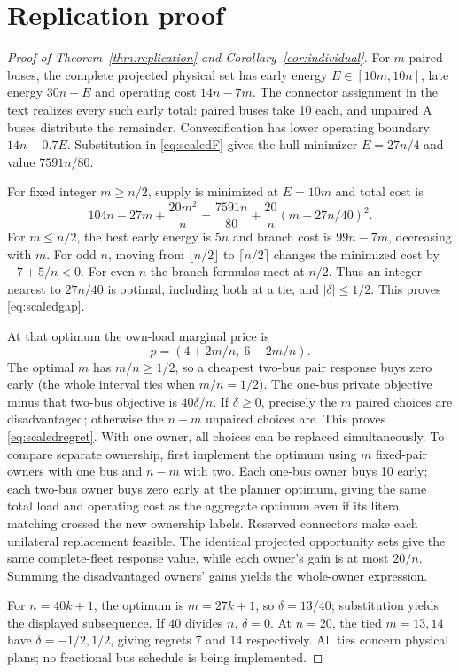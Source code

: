 \section{Replication proof}\label{app:replication}
\begin{proof}[Proof of Theorem~\ref{thm:replication} and
Corollary~\ref{cor:individual}]
For $m$ paired buses, the complete projected physical set has early energy
$E\in[10m,10n]$, late energy $30n-E$ and operating cost $14n-7m$.
The connector assignment in the text realizes every such early total:
paired buses take 10 each, and unpaired A buses distribute the remainder.
Convexification has lower operating boundary $14n-0.7E$. Substitution
in \eqref{eq:scaledF} gives the hull minimizer $E=27n/4$ and value
$7591n/80$.

For fixed integer $m\ge n/2$, supply is minimized at $E=10m$ and total
cost is
\[
 104n-27m+\frac{20m^2}{n}
 =\frac{7591n}{80}+\frac{20}{n}(m-27n/40)^2.
\]
For $m\le n/2$, the best early energy is $5n$ and branch cost is
$99n-7m$, decreasing with $m$. For odd $n$, moving from
$\lfloor n/2\rfloor$ to $\lceil n/2\rceil$ changes the minimized
cost by $-7+5/n<0$. For even $n$ the branch formulas meet at $n/2$.
Thus an integer nearest to $27n/40$ is optimal, including both at a tie,
and $|\delta|\le1/2$. This proves \eqref{eq:scaledgap}.

At that optimum the own-load marginal price is
\[
 p=(4+2m/n,\ 6-2m/n).
\]
The optimal $m$ has $m/n\ge1/2$, so a cheapest two-bus pair response
buys zero early (the whole interval ties when $m/n=1/2$).
The one-bus private objective minus that two-bus
objective is $40\delta/n$. If $\delta\ge0$, precisely the $m$
paired choices are disadvantaged; otherwise the $n-m$ unpaired choices
are. This proves \eqref{eq:scaledregret}. With one owner, all choices can
be replaced simultaneously. To compare separate ownership, first implement
the optimum using $m$ fixed-pair owners with one bus and $n-m$ with two.
Each one-bus owner buys 10 early; each two-bus owner buys zero early at the
planner optimum, giving the same total load and operating cost as the
aggregate optimum even if its literal matching crossed the new ownership
labels. Reserved connectors make each unilateral replacement feasible.
The identical projected opportunity sets give the same complete-fleet
response value, while each owner's gain is at most $20/n$. Summing the
disadvantaged owners' gains yields the whole-owner expression.

For $n=40k+1$, the optimum is $m=27k+1$, so $\delta=13/40$;
substitution yields the displayed subsequence. If $40$ divides $n$,
$\delta=0$. At $n=20$, the tied $m=13,14$ have $\delta=-1/2,1/2$,
giving regrets 7 and 14 respectively. All ties concern physical plans;
no fractional bus schedule is being implemented.
\end{proof}
